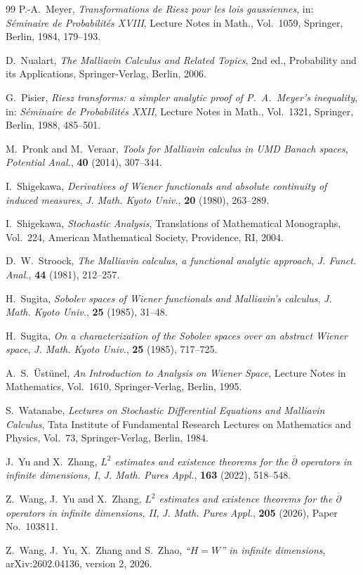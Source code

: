 \documentclass[12pt]{article}
\theoremstyle{plain}
\theoremstyle{definition}
\theoremstyle{remark}
\numberwithin{equation}{section}
\begin{document}
\begin{thebibliography}{99}
P.-A.~Meyer,
\emph{Transformations de Riesz pour les lois gaussiennes},
in: \emph{S\'eminaire de Probabilit\'es XVIII},
Lecture Notes in Math., Vol.~1059,
Springer, Berlin, 1984, 179--193.

D.~Nualart,
\emph{The Malliavin Calculus and Related Topics},
2nd ed., Probability and its Applications,
Springer-Verlag, Berlin, 2006.

G.~Pisier,
\emph{Riesz transforms: a simpler analytic proof of P.~A.~Meyer's
	inequality},
in: \emph{S\'eminaire de Probabilit\'es XXII},
Lecture Notes in Math., Vol.~1321,
Springer, Berlin, 1988, 485--501.

M.~Pronk and M.~Veraar,
\emph{Tools for Malliavin calculus in UMD Banach spaces},
{\sl Potential Anal.}, \textbf{40} (2014), 307--344.

I.~Shigekawa,
\emph{Derivatives of Wiener functionals and absolute continuity of
	induced measures},
{\sl J. Math. Kyoto Univ.}, \textbf{20} (1980), 263--289.

I.~Shigekawa,
\emph{Stochastic Analysis},
Translations of Mathematical Monographs, Vol.~224,
American Mathematical Society, Providence, RI, 2004.

D.~W.~Stroock,
\emph{The Malliavin calculus, a functional analytic approach},
{\sl J. Funct. Anal.}, \textbf{44} (1981), 212--257.

H.~Sugita,
\emph{Sobolev spaces of Wiener functionals and Malliavin's calculus},
{\sl J. Math. Kyoto Univ.}, \textbf{25} (1985), 31--48.

H.~Sugita,
\emph{On a characterization of the Sobolev spaces over an abstract
	Wiener space},
{\sl J. Math. Kyoto Univ.}, \textbf{25} (1985), 717--725.

A.~S.~\"Ust\"unel,
\emph{An Introduction to Analysis on Wiener Space},
Lecture Notes in Mathematics, Vol.~1610,
Springer-Verlag, Berlin, 1995.

S.~Watanabe,
\emph{Lectures on Stochastic Differential Equations and Malliavin
	Calculus},
Tata Institute of Fundamental Research Lectures on Mathematics and
Physics, Vol.~73,
Springer-Verlag, Berlin, 1984.

J.~Yu and X.~Zhang,
\emph{$L^2$ estimates and existence theorems for the
	$\overline{\partial}$ operators in infinite dimensions, I},
{\sl J. Math. Pures Appl.}, \textbf{163} (2022), 518--548.

Z.~Wang, J.~Yu and X.~Zhang,
\emph{$L^2$ estimates and existence theorems for the
	$\overline{\partial}$ operators in infinite dimensions, II},
{\sl J. Math. Pures Appl.}, \textbf{205} (2026),
Paper No.~103811.

Z.~Wang, J.~Yu, X.~Zhang and S.~Zhao,
\emph{``$H=W$'' in infinite dimensions},
arXiv:2602.04136, version 2, 2026.
\end{thebibliography}
\end{document}
